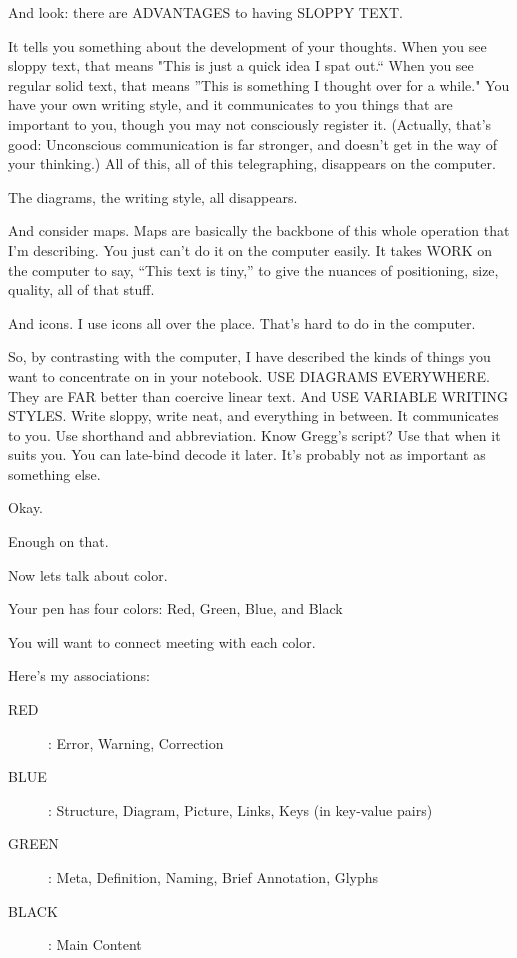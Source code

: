 \documentclass[oneside]{scrbook}
\newcommand\pause{\bigskip\noindent}
\begin{document}
And look: there are ADVANTAGES to having SLOPPY TEXT.

It tells you something about the development of your thoughts. When
you see sloppy text, that means "This is just a quick idea I spat
out.`` When you see regular solid text, that means ''This is something I
thought over for a while." You have your own writing style, and it
communicates to you things that are important to you, though you may
not consciously register it. (Actually, that's good: Unconscious
communication is far stronger, and doesn't get in the way of your
thinking.) All of this, all of this telegraphing, disappears on the
computer.

The diagrams, the writing style, all disappears.

And consider maps. Maps are basically the backbone of this whole
operation that I'm describing. You just can't do it on the computer
easily. It takes WORK on the computer to say, ``This text is tiny,'' to
give the nuances of positioning, size, quality, all of that stuff.

And icons. I use icons all over the place. That's hard to do in the
computer.

So, by contrasting with the computer, I have described the kinds of
things you want to concentrate on in your notebook. USE DIAGRAMS
EVERYWHERE. They are FAR better than coercive linear text. And USE
VARIABLE WRITING STYLES. Write sloppy, write neat, and everything in
between. It communicates to you. Use shorthand and abbreviation. Know
Gregg's script? Use that when it suits you. You can late-bind decode
it later. It's probably not as important as something else.

\pause 

Okay.

Enough on that.

Now lets talk about color.

Your pen has four colors: Red, Green, Blue, and Black

You will want to connect meeting with each color.

Here's my associations:

\begin{description}
  \item[RED ]:     Error, Warning, Correction
  \item[BLUE ]:    Structure, Diagram, Picture, Links, Keys (in key-value pairs)
  \item[GREEN ]:   Meta, Definition, Naming, Brief Annotation, Glyphs
  \item[BLACK ]:   Main Content
\end{description}
\end{document}
